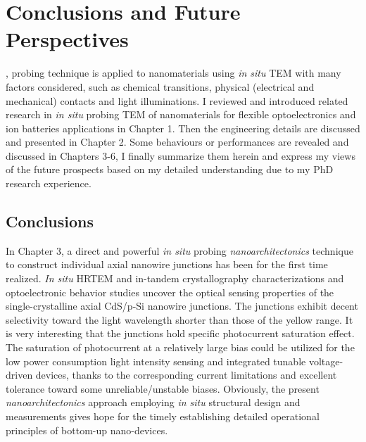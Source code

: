 

\chapter{Conclusions and Future Perspectives}

, probing technique is applied to nanomaterials using \emph{in situ} TEM with many factors considered, such as chemical transitions, physical (electrical and mechanical) contacts and light illuminations. 
I reviewed and introduced related research in {\it in situ} probing TEM of nanomaterials for flexible optoelectronics and ion batteries applications in Chapter 1. 
Then the engineering details are discussed and presented in Chapter 2. 
Some behaviours or performances are revealed and discussed in Chapters 3-6, I finally summarize them herein and express my views of the future prospects based on my detailed understanding due to my PhD research experience. 

\section{Conclusions}
In Chapter 3, a direct and powerful {\it in situ} probing \textit{nanoarchitectonics} technique to construct individual axial nanowire junctions has been for the first time realized. 
{\it In situ} HRTEM and in-tandem crystallography characterizations and optoelectronic behavior studies uncover the optical sensing properties of the single-crystalline axial CdS/p-Si nanowire junctions. 
The junctions exhibit decent selectivity toward the light wavelength shorter than those of the yellow range. 
It is very interesting that the junctions hold specific photocurrent saturation effect. 
The saturation of photocurrent at a relatively large bias could be utilized for the low power consumption light intensity sensing and integrated tunable voltage-driven devices, thanks to the corresponding current limitations and excellent tolerance toward some unreliable/unstable biases. 
Obviously, the present {\it nanoarchitectonics} approach employing {\it in situ} structural design and measurements gives hope for the timely establishing detailed operational principles of bottom-up nano-devices. \\


